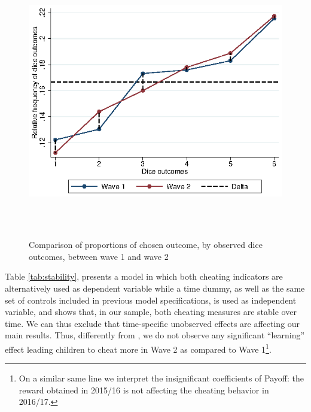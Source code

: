 \documentclass[authoryear, preprint, review, 12pt]{elsarticle}
\begin{document}
\begin{figure}[h!]
\centering
\includegraphics[width=12cm,height=12cm, keepaspectratio]{figures/dice_w1w2compare.eps}
\caption{Comparison of proportions of chosen outcome, by observed dice outcomes, between wave 1 and wave 2}
\label{fig:dicediff}
\end{figure}

Table \ref{tab:stability}, presents a model in which both cheating indicators are alternatively used as dependent variable while a time dummy, as well as the same set of controls included in previous model specifications, is used as independent variable, and shows that, in our sample, both cheating measures are stable over time. We can thus exclude that time-specific unobserved effects are affecting our main results. Thus, differently from \cite{ff13}, we do not observe any significant \enquote{learning} effect leading children to cheat more in Wave 2 as compared to Wave 1\footnote{On a similar same line we interpret the insignificant coefficients of Payoff: the reward obtained in 2015/16 is not affecting the cheating behavior in 2016/17.}.


\end{document}
